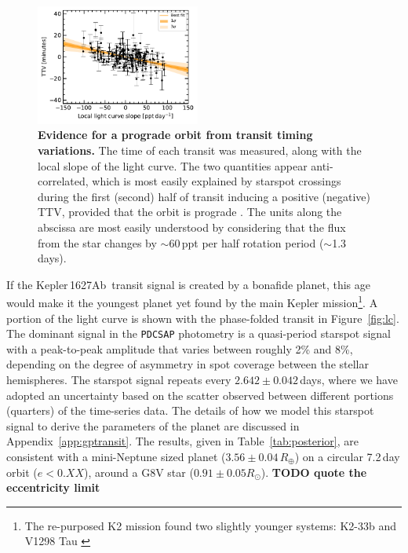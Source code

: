 \documentclass[12pt,modern,twocolumn,tighten]{aastex63}
\newcommand{\pn}{Kepler\,1627Ab} %
\begin{document}
\begin{figure}[tp]
	\begin{center}
		\leavevmode
		\includegraphics[width=0.48\textwidth]{f11.pdf}
	\end{center}
	\vspace{-0.7cm}
	\caption{
		{\bf Evidence for a prograde orbit from transit timing variations.}
    The time of each transit was measured, along with the local slope
    of the light curve.  The two quantities appear anti-correlated,
    which is most easily explained by starspot crossings during the
    first (second) half of transit inducing a positive (negative) TTV,
    provided that the orbit is prograde \citep{mazeh_time_2015}.  The
    units along the abscissa are most easily understood by considering
    that the flux from the star changes by $\sim$60\,ppt per half
    rotation period ($\sim$1.3\,days).
		\label{fig:ttvslope}
	}
\end{figure}



If the \pn\ transit signal is created by a bonafide planet, this age
would make it the youngest planet yet found by the main Kepler
mission\footnote{The re-purposed K2 mission found two slightly younger
systems: K2-33b \citep{David_et_al_2017,Mann_K2_33b_2016} and V1298
Tau \citep{david_four_2019}}.  A portion of the light curve is shown
with the phase-folded transit
in Figure~\ref{fig:lc}.  The dominant signal in the
\texttt{PDCSAP} photometry is a quasi-period starspot signal with a
peak-to-peak amplitude that varies between roughly 2\% and 8\%,
depending on the degree of asymmetry in spot coverage between the
stellar hemispheres.  The starspot signal repeats every
$2.642\pm0.042$\,days, where we have adopted an uncertainty based on
the scatter observed between different portions (quarters) of the
time-series data.  The details of how we model this starspot signal to
derive the parameters of the planet are discussed in
Appendix~\ref{app:gptransit}.  The results, given in
Table~\ref{tab:posterior}, are consistent with a mini-Neptune sized
planet ($3.56\pm 0.04\,R_\oplus$) on a circular 7.2\,day orbit
($e<0.XX$), around a G8V star ($0.91 \pm 0.05 R_\odot$).  {\bf TODO
quote the eccentricity limit}
\end{document}
